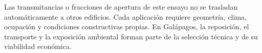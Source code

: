 Las transmitancias o fracciones de apertura de este ensayo no se trasladan automáticamente a otros edificios. Cada aplicación requiere geometría, clima, ocupación y condiciones constructivas propias. En Galápagos, la reposición, el transporte y la exposición ambiental forman parte de la selección técnica y de su viabilidad económica.
